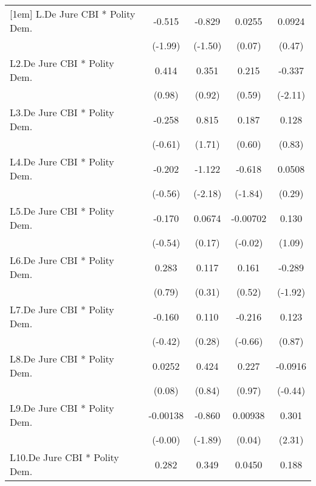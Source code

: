 {\begin{longtable}{l*{4}{c}}
[1em]
L.De Jure CBI * Polity Dem.&   -0.515\sym{*}  &   -0.829         &   0.0255         &   0.0924         \\
                &  (-1.99)         &  (-1.50)         &   (0.07)         &   (0.47)         \\
[1em]
L2.De Jure CBI * Polity Dem.&    0.414         &    0.351         &    0.215         &   -0.337\sym{*}  \\
                &   (0.98)         &   (0.92)         &   (0.59)         &  (-2.11)         \\
[1em]
L3.De Jure CBI * Polity Dem.&   -0.258         &    0.815         &    0.187         &    0.128         \\
                &  (-0.61)         &   (1.71)         &   (0.60)         &   (0.83)         \\
[1em]
L4.De Jure CBI * Polity Dem.&   -0.202         &   -1.122\sym{*}  &   -0.618         &   0.0508         \\
                &  (-0.56)         &  (-2.18)         &  (-1.84)         &   (0.29)         \\
[1em]
L5.De Jure CBI * Polity Dem.&   -0.170         &   0.0674         & -0.00702         &    0.130         \\
                &  (-0.54)         &   (0.17)         &  (-0.02)         &   (1.09)         \\
[1em]
L6.De Jure CBI * Polity Dem.&    0.283         &    0.117         &    0.161         &   -0.289         \\
                &   (0.79)         &   (0.31)         &   (0.52)         &  (-1.92)         \\
[1em]
L7.De Jure CBI * Polity Dem.&   -0.160         &    0.110         &   -0.216         &    0.123         \\
                &  (-0.42)         &   (0.28)         &  (-0.66)         &   (0.87)         \\
[1em]
L8.De Jure CBI * Polity Dem.&   0.0252         &    0.424         &    0.227         &  -0.0916         \\
                &   (0.08)         &   (0.84)         &   (0.97)         &  (-0.44)         \\
[1em]
L9.De Jure CBI * Polity Dem.& -0.00138         &   -0.860         &  0.00938         &    0.301\sym{*}  \\
                &  (-0.00)         &  (-1.89)         &   (0.04)         &   (2.31)         \\
[1em]
L10.De Jure CBI * Polity Dem.&    0.282\sym{*}  &    0.349\sym{*}  &   0.0450         &    0.188         \\

\end{longtable}}
